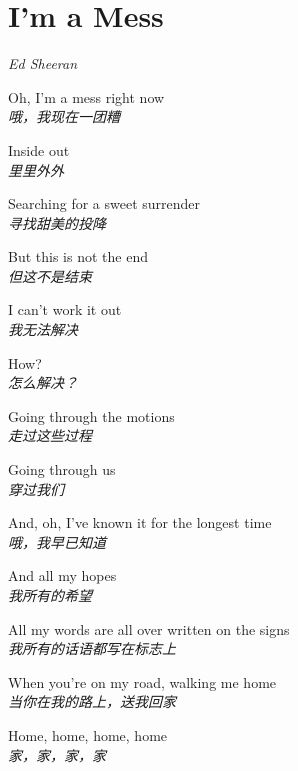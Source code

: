 \section{I'm a Mess}

\thispagestyle{empty}


\begin{center}
\textit{Ed Sheeran}
\end{center}

\vspace{1em}

\begin{spacing}{1.5}
\begin{flushleft}
Oh, I'm a mess right now\\
\textit{哦，我现在一团糟}\lyricspace

Inside out\\
\textit{里里外外}\lyricspace

Searching for a sweet surrender\\
\textit{寻找甜美的投降}\lyricspace

But this is not the end\\
\textit{但这不是结束}\lyricspace

I can't work it out\\
\textit{我无法解决}\lyricspace

How?\\
\textit{怎么解决？}\lyricspace

Going through the motions\\
\textit{走过这些过程}\lyricspace

Going through us\\
\textit{穿过我们}\lyricspace

And, oh, I've known it for the longest time\\
\textit{哦，我早已知道}\lyricspace

And all my hopes\\
\textit{我所有的希望}\lyricspace

All my words are all over written on the signs\\
\textit{我所有的话语都写在标志上}\lyricspace

When you're on my road, walking me home\\
\textit{当你在我的路上，送我回家}\lyricspace

Home, home, home, home\\
\textit{家，家，家，家}\lyricspace


\end{flushleft}
\end{spacing}
